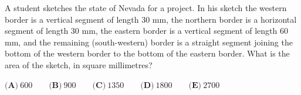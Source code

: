 A student sketches the state of Nevada for a project. In his sketch the western border is a vertical segment of length $30$ mm, the northern border is a horizontal segment of length $30$ mm, the eastern border is a vertical segment of length $60$ mm, and the remaining (south-western) border is a straight segment joining the bottom of the western border to the bottom of the eastern border. What is the area of the sketch, in square millimetres?

$\textbf{(A)}\ 600\qquad\textbf{(B)}\ 900\qquad\textbf{(C)}\ 1350\qquad\textbf{(D)}\ 1800\qquad\textbf{(E)}\ 2700$
